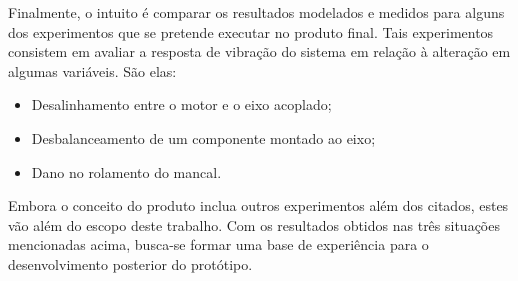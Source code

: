 \documentclass[12pt,openright,twoside,a4paper,
	chapter=TITLE,section=TITLE,
	english,brazil]{abntex2}
\begin{document}
	Finalmente, o intuito é comparar os resultados modelados e medidos para alguns dos experimentos que se pretende executar no produto final. Tais experimentos consistem em avaliar a resposta de vibração do sistema em relação à alteração em algumas variáveis. São elas:
	\begin{itemize}
		\setlength{\itemsep}{0pt plus 2pt minus 1pt}
		\item Desalinhamento entre o motor e o eixo acoplado;
		\item Desbalanceamento de um componente montado ao eixo;
		\item Dano no rolamento do mancal.
	\end{itemize}

	Embora o conceito do produto inclua outros experimentos além dos citados, estes vão além do escopo deste trabalho. Com os resultados obtidos nas três situações mencionadas acima, busca-se formar uma base de experiência para o desenvolvimento posterior do protótipo.
	
	\postextual
	
	
		
\end{document}
